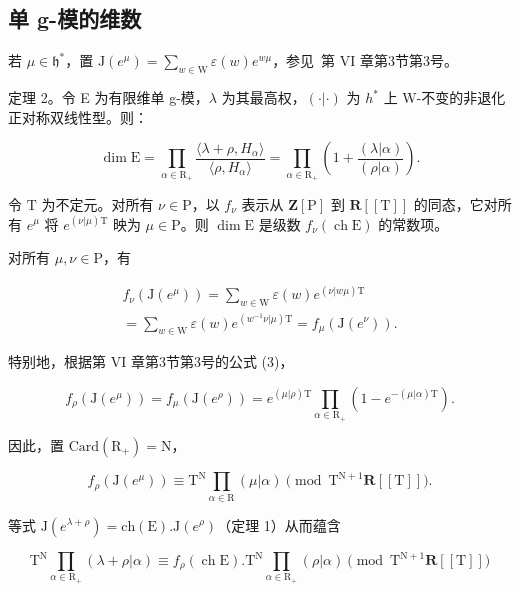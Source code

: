\subsection{单 g-模的维数}

若 \(\mu \in \mathfrak{h}^*\)，置 \(\mathrm{J}(e^{\mu}) = \sum_{w\in \mathrm{W}}\varepsilon (w)e^{w\mu}\)，参见~第 VI 章第3节第3号。

定理 2。令 E 为有限维单 g-模，\(\lambda\) 为其最高权，\((\cdot|\cdot)\) 为 \(h^{*}\) 上 W-不变的非退化正对称双线性型。则：

\[
\dim \mathrm{E} = \prod_ {\alpha \in \mathrm{R} _ {+}} \frac {\langle \lambda + \rho , H _ {\alpha} \rangle}{\langle \rho , H _ {\alpha} \rangle} = \prod_ {\alpha \in \mathrm{R} _ {+}} \left(1 + \frac {(\lambda | \alpha)}{(\rho | \alpha)}\right).
\]

令 \(\mathrm{T}\) 为不定元。对所有 \(\nu \in \mathrm{P}\)，以 \(f_{\nu}\) 表示从 \(\mathbf{Z}[\mathrm{P}]\) 到 \(\mathbf{R}[[\mathrm{T}]]\) 的同态，它对所有 \(e^{\mu}\) 将 \(e^{(\nu |\mu)\mathrm{T}}\) 映为 \(\mu \in \mathrm{P}\)。则 \(\dim \mathrm{E}\) 是级数 \(f_{\nu}(\operatorname{ch}\mathrm{E})\) 的常数项。

对所有 \(\mu, \nu \in \mathrm{P}\)，有

\[
\begin{array}{c} f _ {\nu} (\mathrm{J} (e ^ {\mu})) = \sum_ {w \in \mathrm{W}} \varepsilon (w) e ^ {(\nu | w \mu) \mathrm{T}} \\ = \sum_ {w \in \mathrm{W}} \varepsilon (w) e ^ {(w ^ {- 1} \nu | \mu) \mathrm{T}} = f _ {\mu} (\mathrm{J} (e ^ {\nu})). \end{array}
\]

特别地，根据第 VI 章第3节第3号的公式 (3)，

\[
f _ {\rho} (\mathrm{J} (e ^ {\mu})) = f _ {\mu} (\mathrm{J} (e ^ {\rho})) = e ^ {(\mu | \rho) \mathrm{T}} \prod_ {\alpha \in \mathrm{R} _ {+}} (1 - e ^ {- (\mu | \alpha) \mathrm{T}}).
\]

因此，置 \(\mathrm{Card}(\mathrm{R}_{+})=\mathrm{N}\)，

\[
f _ {\rho} (\mathrm{J} (e ^ {\mu})) \equiv \mathrm{T} ^ {\mathrm{N}} \prod_ {\alpha \in \mathrm{R}} (\mu | \alpha) \pmod {\mathrm{T} ^ {\mathrm{N} + 1} \mathbf {R} [ [ \mathrm{T} ] ]}.
\]

等式 \(\mathrm{J}(e^{\lambda +\rho}) = \mathrm{ch}(\mathrm{E}).\mathrm{J}(e^{\rho})\)（定理 1）从而蕴含

\[
\mathrm{T} ^ {\mathrm{N}} \prod_ {\alpha \in \mathrm{R} _ {+}} (\lambda + \rho | \alpha) \equiv f _ {\rho} (\operatorname{ch} \mathrm{E}). \mathrm{T} ^ {\mathrm{N}} \prod_ {\alpha \in \mathrm{R} _ {+}} (\rho | \alpha) \pmod {\mathrm{T} ^ {\mathrm{N} + 1} \mathbf {R} [ [ \mathrm{T} ] ]}
\]

